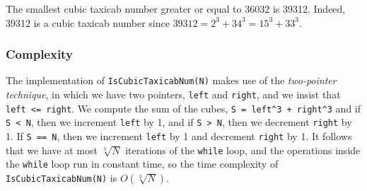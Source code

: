 \begin{example}
	The smallest cubic taxicab number greater or equal to 36032 is 39312. Indeed, 39312 is a cubic taxicab number since $39312 = 2^3 + 34^3 = 15^3 + 33^3$.
\end{example}

\subsubsection{Complexity}
The implementation of \lstinline|IsCubicTaxicabNum(N)| makes use of the \textit{two-pointer technique}, in which we have two pointers, \lstinline|left| and \lstinline|right|, and we insist that \lstinline|left <= right|. We compute the sum of the cubes, \lstinline|S = left^3 + right^3| and if \lstinline|S < N|, then we increment \lstinline|left| by 1, and if \lstinline|S > N|, then we decrement \lstinline|right| by 1. If \lstinline|S == N|, then we increment \lstinline|left| by 1 and decrement \lstinline|right| by 1. It follows that we have at most $\sqrt[3]{N}$ iterations of the \lstinline|while| loop, and the operations inside the \lstinline|while| loop run in constant time, so the time complexity of \lstinline|IsCubicTaxicabNum(N)| is $O(\sqrt[3]{N})$.
